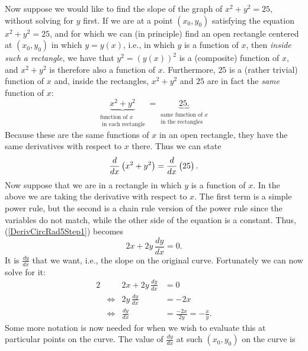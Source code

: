 Now suppose we would like to find the slope of 
the graph of $x^2+y^2=25$, without solving for $y$
first.\footnotemark{}\hphantom{. }
If we are at a point $(x_0,y_0)$ satisfying the
equation $x^2+y^2=25$, and for which 
we can (in principle) find an open rectangle
centered at $(x_0,y_0)$ in which $y=y(x)$,
i.e., in which $y$  is a function of $x$,
then {\it inside such a rectangle},
we have that $y^2=(y(x))^2$ is a (composite) function
of $x$, and $x^2+y^2$ is therefore also a  function of $x$.
Furthermore, $25$ is a (rather trivial) function of $x$ and,
inside the rectangles, 
$x^2+y^2$ and $25$ are  in fact the {\it same} function of $x$:
$$\underbrace{x^2+y^2}_{{\begin{array}{c}\text{function of }x\\
\text{ in each rectangle}\end{array}}}
=\underbrace{25.}_{\begin{array}{c}\text{same function of }x\\
\text{in the rectangles}\end{array}}$$
Because these are the same functions of $x$ in an open rectangle, they
have the same derivatives with respect to  $x$ there.  Thus we can state
\begin{equation}
\frac{d}{dx}\left(x^2+y^2\right)=\frac{d}{dx}\left(
\vphantom{x^2}25\right).\label{DerivCircRad5Step1}\end{equation}
Now suppose that we are in a rectangle in which $y$ is
a function of $x$.  In the above we are taking
the derivative with respect to $x$.  The first
term is a simple power rule, but the second is a
chain rule version of the power rule since the
variables do not match, while the other side of the equation
is a constant.  Thus, (\ref{DerivCircRad5Step1}) becomes
$${2x}+{2y\,\frac{dy}{dx}}={0}.$$
It is $\frac{dy}{dx}$ that we want, i.e., the slope
on the original curve.  Fortunately  we can now solve for it:
\begin{alignat*}{2}
&&2x+2y\,\frac{dy}{dx}&=0\\
&\iff&2y\,\frac{dy}{dx}&=-2x\\
&\iff&\frac{dy}{dx}&=\frac{-2x}{2y}=-\frac{x}y.\end{alignat*}
Some more notation is now needed for when we wish to 
evaluate this at particular points on the curve.
The value of $\frac{dy}{dx}$ at such $(x_0,y_0)$ on the curve is 

